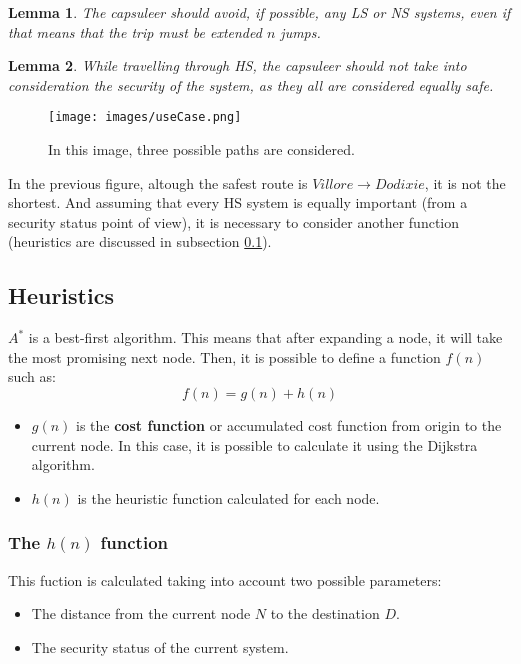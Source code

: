 \documentclass{article}
\theoremstyle{customdef}
\newtheorem{lemma}{Lemma}
\begin{document}
\begin{lemma}
The capsuleer should avoid, if possible, any LS or NS systems, even if that means that the trip must be extended $n$ jumps.
\end{lemma}

\begin{lemma}
While travelling through HS, the capsuleer should not take into consideration the security of the system, as they all are considered equally safe.
\end{lemma}

\begin{figure}[H]
    \centering
    \texttt{[image: images/useCase.png]}
    \caption{In this image, three possible paths are considered.}
    \label{fig:useCase}
\end{figure}

In the previous figure, altough the safest route is $Villore \rightarrow Dodixie$, it is not the shortest. And assuming that every HS system is equally important (from a security status point of view), it is necessary to consider another function (heuristics are discussed in subsection \ref{sec:heuristics}).

\subsection{Heuristics}\label{sec:heuristics}

$A^*$ is a best-first algorithm. This means that after expanding a node, it will take the most promising next node. Then, it is possible to define a function $f(n)$ such as:
$$f(n) = g(n) + h(n)$$
\begin{itemize}
    \item $g(n)$ is the \textbf{cost function} or accumulated cost function from origin to the current node. In this case, it is possible to calculate it using the Dijkstra algorithm.
    \item $h(n)$ is the heuristic function calculated for each node. 
\end{itemize}

\subsubsection{The $h(n)$ function}

This fuction is calculated taking into account two possible parameters:

\begin{itemize}
    \item The distance from the current node $N$ to the destination $D$.
    \item The security status of the current system.
\end{itemize}
\end{document}
